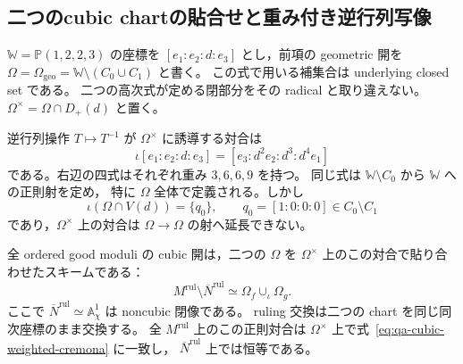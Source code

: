
\subsection{二つのcubic chartの貼合せと重み付き逆行列写像}
\label{subsec:qa-cubic-inversion-gluing}

$\mathbb W=\mathbb P(1,2,2,3)$ の座標を
$[e_1:e_2:d:e_3]$ とし，前項の geometric 開を
$\Omega=\Omega_{\mathrm{geo}}=\mathbb W\setminus(C_0\cup C_1)$ と書く。
この式で用いる補集合は underlying closed set である。
二つの高次式が定める閉部分をその radical と取り違えない。
$\Omega^\times=\Omega\cap D_+(d)$ と置く。

\begin{proposition}
\label{prop:qa-cubic-weighted-inversion-gluing}
逆行列操作 $T\mapsto T^{-1}$ が $\Omega^\times$ に誘導する対合は
\[
 \iota[e_1:e_2:d:e_3]
       =[e_3:d^2e_2:d^3:d^4e_1]
 \tag{INV}\label{eq:qa-cubic-weighted-cremona}
\]
である。右辺の四式はそれぞれ重み $3,6,6,9$ を持つ。
同じ式は $\mathbb W\setminus C_0$ から $\mathbb W$ への正則射を定め，
特に $\Omega$ 全体で定義される。しかし
\[
 \iota(\Omega\cap V(d))=\{q_0\},
 \qquad q_0=[1:0:0:0]\in C_0\setminus C_1
\]
であり，$\Omega^\times$ 上の対合は $\Omega\to\Omega$ の射へ延長できない。

全 ordered good moduli の cubic 開は，二つの $\Omega$ を
$\Omega^\times$ 上のこの対合で貼り合わせたスキームである：
\[
 M^{\mathrm{rul}}\setminus\overline N^{\mathrm{rul}}
   \simeq\Omega_f\mathop{\cup}_{\iota}\Omega_g.
 \tag{GL}\label{eq:qa-cubic-two-git-chart-gluing}
\]
ここで $\overline N^{\mathrm{rul}}\simeq\mathbb A^1_\chi$ は noncubic 閉像である。
ruling 交換は二つの chart を同じ同次座標のまま交換する。
全 $M^{\mathrm{rul}}$ 上のこの正則対合は
$\Omega^\times$ 上で式~\eqref{eq:qa-cubic-weighted-cremona} に一致し，
$\overline N^{\mathrm{rul}}$ 上では恒等である。
\end{proposition}
